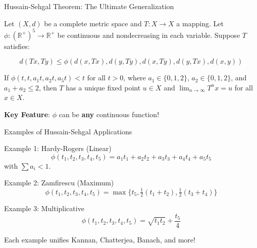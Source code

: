 \documentclass[aspectratio=169,10pt]{beamer}
\begin{document}
\begin{frame}{Hussain-Sehgal Theorem: The Ultimate Generalization}
    \begin{theorem}
        Let $(X, d)$ be a complete metric space and $T : X \to X$ a mapping.
        Let $\phi : (\mathbb{R}^+)^5 \to \mathbb{R}^+$ be continuous and
        nondecreasing in each variable. Suppose $T$ satisfies:

        \begin{equation}
            d(Tx, Ty) \leq \phi(d(x,Tx), d(y,Ty), d(x,Ty), d(y,Tx), d(x,y))
            \label{eq:hussain-sehgal}
        \end{equation}

        If $\phi(t, t, a_1 t, a_2 t, a_5 t) < t$ for all $t > 0$,
        where $a_1 \in \{0, 1, 2\}$, $a_2 \in \{0, 1, 2\}$, and $a_1 + a_2 \leq 2$,
        then $T$ has a unique fixed point $u \in X$ and
        $\lim_{n \to \infty} T^n x = u$ for all $x \in X$.
    \end{theorem}

    \vspace{0.3cm}
    \textbf{Key Feature}: $\phi$ can be \textbf{any} continuous function!
\end{frame}

\begin{frame}{Examples of Hussain-Sehgal Applications}
    \begin{block}{Example 1: Hardy-Rogers (Linear)}
        \begin{equation*}
            \phi(t_1, t_2, t_3, t_4, t_5) = a_1 t_1 + a_2 t_2 + a_3 t_3 + a_4 t_4 + a_5 t_5
        \end{equation*}
        with $\sum a_i < 1$.
    \end{block}

    \begin{block}{Example 2: Zamfirescu (Maximum)}
        \begin{equation*}
            \phi(t_1, t_2, t_3, t_4, t_5) = \max\{t_5, \tfrac{1}{2}(t_1 + t_2), \tfrac{1}{2}(t_3 + t_4)\}
        \end{equation*}
    \end{block}

    \begin{block}{Example 3: Multiplicative}
        \begin{equation*}
            \phi(t_1, t_2, t_3, t_4, t_5) = \sqrt{t_1 t_2} + \frac{t_5}{4}
        \end{equation*}
    \end{block}

    \vspace{0.3cm}
    Each example unifies Kannan, Chatterjea, Banach, and more!
\end{frame}
\end{document}
